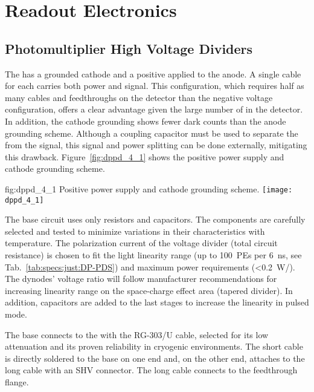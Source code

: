 \section{Readout Electronics}
\label{sec:dp-pds-electronics}

\subsection{Photomultiplier High Voltage Dividers}
\label{sec:fddp-pd-4.1}

The  has a grounded cathode and a positive  applied to the anode. A single cable for each  carries both power and signal. This configuration, which requires half as many cables and feedthroughs on the detector than the negative voltage configuration, offers a clear advantage given the large number of  in the detector. In addition, the cathode grounding shows fewer dark counts than the anode grounding scheme. Although a coupling capacitor must be used to separate the  from the  signal, this signal and power splitting can be done externally, mitigating this drawback.  Figure~\ref{fig:dppd_4_1} shows the positive power supply and cathode grounding scheme.

\begin{dunefigure}{fig:dppd_4_1}
{Positive power supply and cathode grounding scheme.}
\texttt{[image: dppd\_4\_1]}
\end{dunefigure}

The  base circuit uses only resistors and capacitors. The components are carefully selected and tested to minimize variations in their characteristics with temperature. The polarization current of the voltage divider (total circuit resistance) is chosen to fit the  light linearity range (up to \SI{100}{PEs} per \SI{6}{\ns}, see Tab.~\ref{tab:specs:just:DP-PDS}) and maximum power requirements (\SI{<0.2}{W/}). The dynodes' voltage ratio will follow manufacturer recommendations for increasing linearity range on the space-charge effect area (tapered divider). In addition, capacitors are added to the last stages  to increase the  linearity in pulsed mode.

The  base connects to the \fdth with the RG-303/U cable, selected for its low attenuation and its proven reliability in cryogenic environments. The short cable is directly soldered to the  base on one end and, on the other end, attaches to the long  cable with an SHV connector. The long cable connects to the feedthrough flange.

